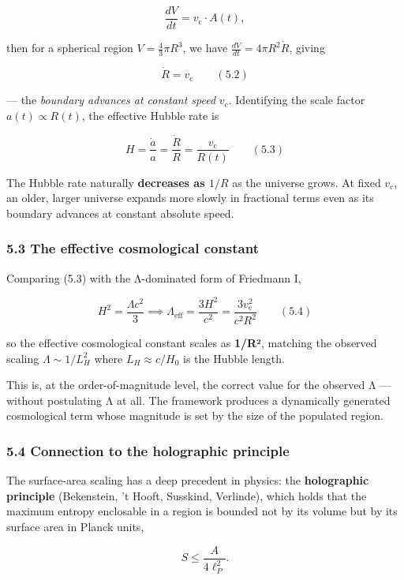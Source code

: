 \documentclass[
]{article}
\begin{document}
\[\frac{dV}{dt} = v_{\text{c}} \cdot A(t),\]

then for a spherical region \(V = \frac{4}{3} \pi R^3\), we have
\(\frac{dV}{dt} = 4 \pi R^2 \dot R\), giving

\[\dot R = v_{\text{c}} \qquad (5.2)\]

--- the \emph{boundary advances at constant speed} \(v_{\text{c}}\).
Identifying the scale factor \(a(t) \propto R(t)\), the effective Hubble
rate is

\[H = \frac{\dot a}{a} = \frac{\dot R}{R} = \frac{v_{\text{c}}}{R(t)} \qquad (5.3)\]

The Hubble rate naturally \textbf{decreases as \(1/R\)} as the universe
grows. At fixed \(v_{\text{c}}\), an older, larger universe expands more
slowly in fractional terms even as its boundary advances at constant
absolute speed.

\subsubsection{5.3 The effective cosmological
constant}\label{the-effective-cosmological-constant}

Comparing (5.3) with the Λ-dominated form of Friedmann I,

\[H^2 = \frac{\Lambda c^2}{3} \implies \Lambda_{\text{eff}} = \frac{3 H^2}{c^2} = \frac{3 v_{\text{c}}^2}{c^2 R^2} \qquad (5.4)\]

so the effective cosmological constant scales as \textbf{1/R²}, matching
the observed scaling \(\Lambda \sim 1/L_H^2\) where
\(L_H \approx c/H_0\) is the Hubble length.

This is, at the order-of-magnitude level, the correct value for the
observed Λ --- without postulating Λ at all. The framework produces a
dynamically generated cosmological term whose magnitude is set by the
size of the populated region.

\subsubsection{5.4 Connection to the holographic
principle}\label{connection-to-the-holographic-principle}

The surface-area scaling has a deep precedent in physics: the
\textbf{holographic principle} (Bekenstein, 't Hooft, Susskind,
Verlinde), which holds that the maximum entropy enclosable in a region
is bounded not by its volume but by its surface area in Planck units,

\[S \leq \frac{A}{4 \ell_P^2}.\]
\end{document}
